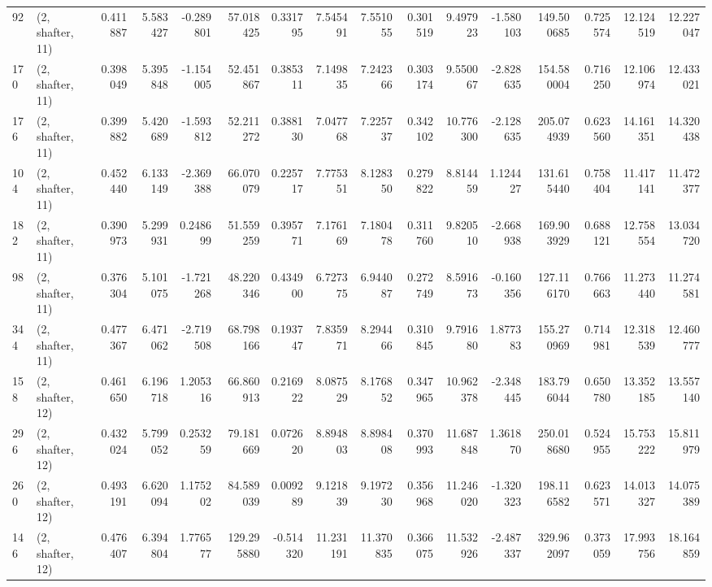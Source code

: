 \begin{tabular}{llrrrrrrrrrrrrrr}
92  &  (2, shafter, 11) &   0.411887 &   5.583427 &  -0.289801 &    57.018425 &   0.331795 &   7.545491 &   7.551055 &  0.301519 &   9.497923 &  -1.580103 &    149.500685 &    0.725574 &   12.124519 &   12.227047 \\
170 &  (2, shafter, 11) &   0.398049 &   5.395848 &  -1.154005 &    52.451867 &   0.385311 &   7.149835 &   7.242366 &  0.303174 &   9.550067 &  -2.828635 &    154.580004 &    0.716250 &   12.106974 &   12.433021 \\
176 &  (2, shafter, 11) &   0.399882 &   5.420689 &  -1.593812 &    52.211272 &   0.388130 &   7.047768 &   7.225737 &  0.342102 &  10.776300 &  -2.128635 &    205.074939 &    0.623560 &   14.161351 &   14.320438 \\
104 &  (2, shafter, 11) &   0.452440 &   6.133149 &  -2.369388 &    66.070079 &   0.225717 &   7.775351 &   8.128350 &  0.279822 &   8.814459 &   1.124427 &    131.615440 &    0.758404 &   11.417141 &   11.472377 \\
182 &  (2, shafter, 11) &   0.390973 &   5.299931 &   0.248699 &    51.559259 &   0.395771 &   7.176169 &   7.180478 &  0.311760 &   9.820510 &  -2.668938 &    169.903929 &    0.688121 &   12.758554 &   13.034720 \\
98  &  (2, shafter, 11) &   0.376304 &   5.101075 &  -1.721268 &    48.220346 &   0.434900 &   6.727375 &   6.944087 &  0.272749 &   8.591673 &  -0.160356 &    127.116170 &    0.766663 &   11.273440 &   11.274581 \\
344 &  (2, shafter, 11) &   0.477367 &   6.471062 &  -2.719508 &    68.798166 &   0.193747 &   7.835971 &   8.294466 &  0.310845 &   9.791680 &   1.877383 &    155.270969 &    0.714981 &   12.318539 &   12.460777 \\
158 &  (2, shafter, 12) &   0.461650 &   6.196718 &   1.205316 &    66.860913 &   0.216922 &   8.087529 &   8.176852 &  0.347965 &  10.962378 &  -2.348445 &    183.796044 &    0.650780 &   13.352185 &   13.557140 \\
296 &  (2, shafter, 12) &   0.432024 &   5.799052 &   0.253259 &    79.181669 &   0.072620 &   8.894803 &   8.898408 &  0.370993 &  11.687848 &   1.361870 &    250.018680 &    0.524955 &   15.753222 &   15.811979 \\
260 &  (2, shafter, 12) &   0.493191 &   6.620094 &   1.175202 &    84.589039 &   0.009289 &   9.121839 &   9.197230 &  0.356968 &  11.246020 &  -1.320323 &    198.116582 &    0.623571 &   14.013327 &   14.075389 \\
146 &  (2, shafter, 12) &   0.476407 &   6.394804 &   1.776577 &   129.295880 &  -0.514320 &  11.231191 &  11.370835 &  0.366075 &  11.532926 &  -2.487337 &    329.962097 &    0.373059 &   17.993756 &   18.164859 \\

\end{tabular}
